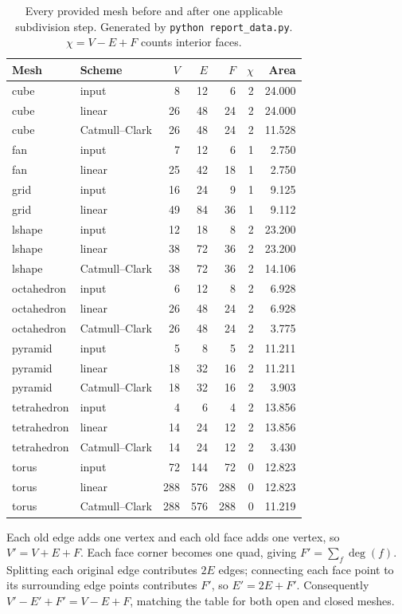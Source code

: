 \documentclass[11pt,a4paper]{article}
\newcommand{\code}[1]{\texttt{#1}}
\begin{document}
\begin{table}[ht]
\centering
\caption{Every provided mesh before and after one applicable subdivision step.
  Generated by \code{python report\_data.py}. $\chi=V-E+F$ counts interior faces.}
\vspace{3pt}
\small
\begin{tabular}{llrrrrr}
\toprule
Mesh & Scheme & $V$ & $E$ & $F$ & $\chi$ & Area \\
\midrule
cube & input & 8 & 12 & 6 & 2 & 24.000 \\
cube & linear & 26 & 48 & 24 & 2 & 24.000 \\
cube & Catmull--Clark & 26 & 48 & 24 & 2 & 11.528 \\
fan & input & 7 & 12 & 6 & 1 & 2.750 \\
fan & linear & 25 & 42 & 18 & 1 & 2.750 \\
grid & input & 16 & 24 & 9 & 1 & 9.125 \\
grid & linear & 49 & 84 & 36 & 1 & 9.112 \\
lshape & input & 12 & 18 & 8 & 2 & 23.200 \\
lshape & linear & 38 & 72 & 36 & 2 & 23.200 \\
lshape & Catmull--Clark & 38 & 72 & 36 & 2 & 14.106 \\
octahedron & input & 6 & 12 & 8 & 2 & 6.928 \\
octahedron & linear & 26 & 48 & 24 & 2 & 6.928 \\
octahedron & Catmull--Clark & 26 & 48 & 24 & 2 & 3.775 \\
pyramid & input & 5 & 8 & 5 & 2 & 11.211 \\
pyramid & linear & 18 & 32 & 16 & 2 & 11.211 \\
pyramid & Catmull--Clark & 18 & 32 & 16 & 2 & 3.903 \\
tetrahedron & input & 4 & 6 & 4 & 2 & 13.856 \\
tetrahedron & linear & 14 & 24 & 12 & 2 & 13.856 \\
tetrahedron & Catmull--Clark & 14 & 24 & 12 & 2 & 3.430 \\
torus & input & 72 & 144 & 72 & 0 & 12.823 \\
torus & linear & 288 & 576 & 288 & 0 & 12.823 \\
torus & Catmull--Clark & 288 & 576 & 288 & 0 & 11.219 \\
\bottomrule
\end{tabular}
\end{table}

Each old edge adds one vertex and each old face adds one vertex, so
$V'=V+E+F$. Each face corner becomes one quad, giving
$F'=\sum_f\deg(f)$. Splitting each original edge contributes $2E$ edges;
connecting each face point to its surrounding edge points contributes $F'$,
so $E'=2E+F'$. Consequently $V'-E'+F'=V-E+F$, matching the table for both
open and closed meshes.
\end{document}
